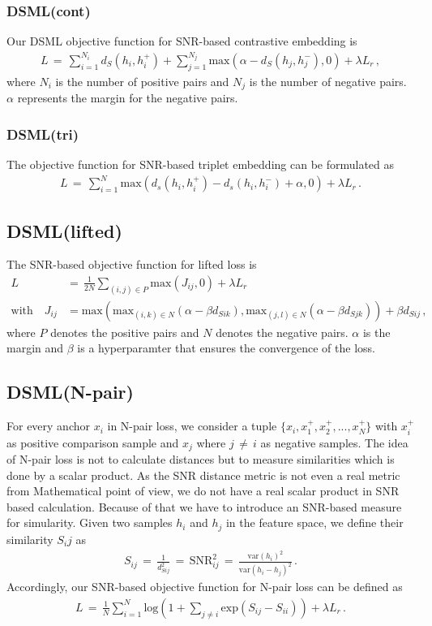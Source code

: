 \documentclass[12pt,paper=a4]{scrartcl}
\theoremstyle{break}
\begin{document}
\subsubsection{DSML(cont)}
Our DSML objective function for SNR-based contrastive embedding is
\begin{align}
L\,=\,\sum_{i=1}^{N_i}d_S\left( h_i,h_i^+\right) +\sum_{j=1}^{N_j}\mathrm{max}\left( \alpha -d_S\left( h_j,h_j^-\right),0\right) + \lambda L_r\, ,
\end{align}
where $N_i$ is the number of positive pairs and $N_j$ is the number of negative pairs. $\alpha$ represents the margin for the negative pairs.
\subsubsection{DSML(tri)}
The objective function for SNR-based triplet embedding can be formulated as
\begin{align}
L\,=\,\sum_{i=1}^N\mathrm{max}\left(d_s\left(h_i,h_i^+\right) - d_s\left( h_i,h_i^-\right)+\alpha,0\right)+\lambda L_r\, .
\end{align}
\subsection{DSML(lifted)}
The SNR-based objective function for lifted loss is
\begin{align}
L\,&=\,\frac{1}{2N}\sum_{(i,j)\in P}\mathrm{max}(J_{ij},0)+\lambda L_r \\
\text{with}\quad J_{ij}&=\mathrm{max}\left(\mathrm{max}_{(i,k)\in N}\left(\alpha - \beta d_{Sik}\right), \mathrm{max}_{(j,l)\in N}\left(\alpha - \beta d_{Sjk}\right)\right)+\beta d_{Sij}\, ,
\end{align}
where $P$ denotes the positive pairs and $N$ denotes the negative pairs. $\alpha$ is the margin and $\beta$ is a hyperparamter that ensures the convergence of the loss.
\subsection{DSML(N-pair)}
For every anchor $x_i$ in N-pair loss, we consider a tuple $\{ x_i, x_1^+, x_2^+, ..., x_N^+\} $ with $x_i^+$ as positive comparison sample and $x_j$ where $j\,\neq\, i$ as negative samples. The idea of N-pair loss is not to calculate distances but to measure similarities which is done by a scalar product. As the SNR distance metric is not even a real metric from Mathematical point of view, we do not have a real scalar product in SNR based calculation. Because of that we have to introduce an SNR-based measure for simularity. Given two samples $h_i$ and $h_j$ in the feature space, we define their similarity $S_ij$ as
\begin{align}
S_{ij}\,=\,\frac{1}{d_{Sij}^2}\, = \, \mathrm{SNR}_{ij}^2 \, =\, \frac{\mathrm{var}(h_i)^2}{\mathrm{var}(h_i-h_j)^2}\, .
\end{align}
Accordingly, our SNR-based objective function for N-pair loss can be defined as
\begin{align}
L\,=\,\frac{1}{N}\sum_{i=1}^N\mathrm{log}\left( 1+\sum_{j\neq i}\mathrm{exp}\left( S_{ij}-S_{ii}\right)\right)+\lambda L_r\, .
\end{align}
\end{document}
